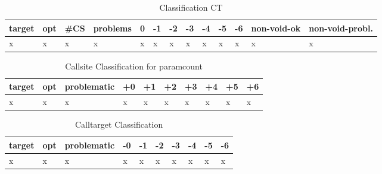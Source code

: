 \begin{table}[H]
\centering
\caption{Classification CT}
\label{Integer overflow bug detection in CWE-190}
\begin{tabular}{|l|l|l|l|l|l|l|l|l|l|l|l|l|} \hline
\textbf{target}  &\textbf{opt} & \textbf{\#CS}     & \textbf{problems}    &\textbf{0} & \textbf{-1}  & \textbf{-2} &\textbf{-3} &\textbf{-4} &\textbf{-5} &\textbf{-6}  &\textbf{non-void-ok}  &\textbf{non-void-probl.}   \\ \hline 
x                &x            &x                  &x                     &x          &x             &x            &x           &x           &x           &x            &x                     &x                          \\ \hline

\end{tabular}
\end{table}


\begin{table}[H]
\centering
\caption{Callsite Classification for paramcount}
\label{Integer overflow bug detection in CWE-190}
\begin{tabular}{|l|l|l|l|l|l|l|l|l|l|} \hline
\textbf{target}  & \textbf{opt}     & \textbf{problematic}    &\textbf{+0} & \textbf{+1}  & \textbf{+2} &\textbf{+3} &\textbf{+4} &\textbf{+5} &\textbf{+6}  \\ \hline 
x                &x                 &x                        &x           &x             &x            &x           &x           &x           &x            \\ \hline

\end{tabular}
\end{table}

\begin{table}[H]
\centering
\caption{Calltarget Classification}
\label{Integer overflow bug detection in CWE-190}
\begin{tabular}{|l|l|l|l|l|l|l|l|l|l|} \hline
\textbf{target}  & \textbf{opt}     & \textbf{problematic}    &\textbf{-0} & \textbf{-1}  & \textbf{-2} &\textbf{-3} &\textbf{-4} &\textbf{-5} &\textbf{-6}  \\ \hline 
x                &x                 &x                        &x           &x             &x            &x           &x           &x           &x            \\ \hline

\end{tabular}
\end{table}

